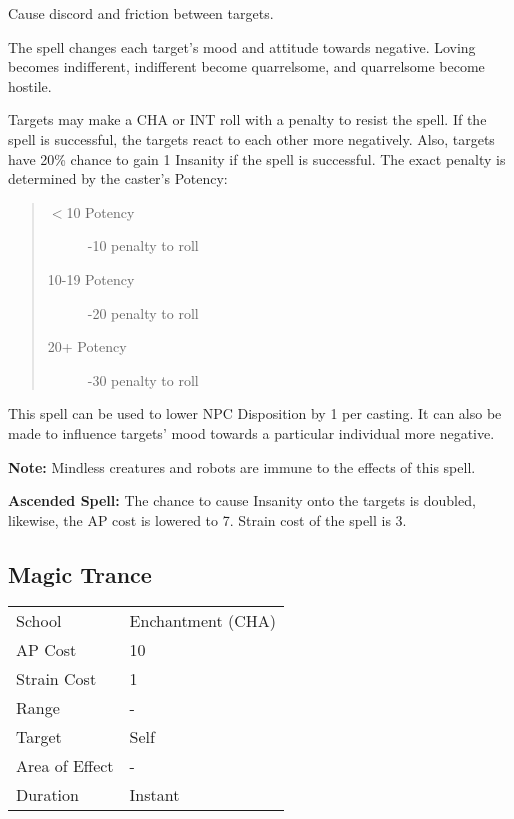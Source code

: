 \documentclass[11pt,a4paper,twocolumn]{book}
\begin{document}
\medskip

Cause discord and friction between targets.

The spell changes each target's mood and attitude towards negative. Loving becomes indifferent, indifferent become quarrelsome, and quarrelsome become hostile.

Targets may make a CHA or INT roll with a penalty to resist the spell. If the spell is successful, the targets react to each other more negatively. Also, targets have 20\% chance to gain 1 Insanity if the spell is successful. The exact penalty is determined by the caster's Potency: 

\begin{quote}
	\begin{description}
		\item[$<$10 Potency] 	-10 penalty to roll
		\item[10-19 Potency] 	-20 penalty to roll
		\item[20+ Potency] 	-30 penalty to roll
	\end{description}
\end{quote}

This spell can be used to lower NPC Disposition by 1 per casting. It can also be made to influence targets' mood towards a particular individual more negative.

\textbf{Note:} Mindless creatures and robots are immune to the effects of this spell.

\bigskip

\textbf{Ascended Spell:} The chance to cause Insanity onto the targets is doubled, likewise, the AP cost is lowered to 7. Strain cost of the spell is 3.

\vfill

\subsection*{Magic Trance}
{
	\begin{tabu} to 75mm{| X[l,4] | X[l,7] |}
		\hline
		School 			& Enchantment (CHA) 		\\
		AP Cost	      	& 10 					\\
		Strain Cost     & 1 					\\
		Range     		& -						\\
		Target      	& Self					\\
		Area of Effect  & -  	 				\\
		Duration     	& Instant			\\ \hline
	\end{tabu}
	
}
\end{document}
